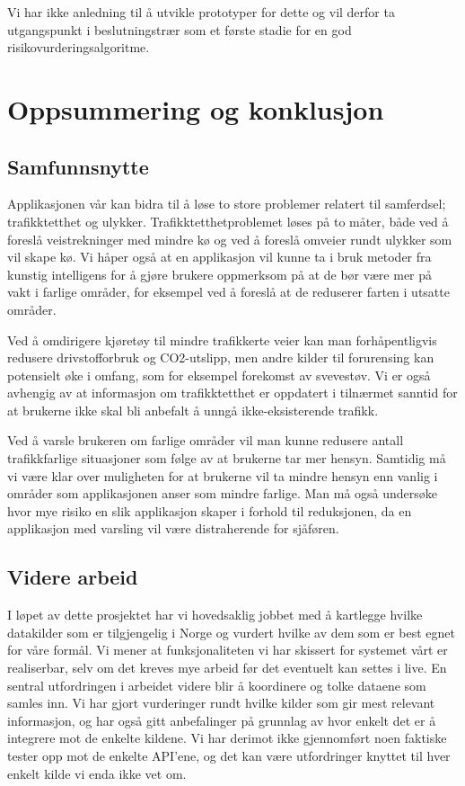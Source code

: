 \documentclass[a4paper,norsk,oneside]{book}
\begin{document}
Vi har ikke anledning til å utvikle prototyper for dette og vil derfor ta utgangspunkt i beslutningstrær som et første stadie for en god risikovurderingsalgoritme.



\chapter{Oppsummering og konklusjon}
\label{sec:konklusjon}

\section{Samfunnsnytte}
\label{sec:samfunnsnytte}

 Applikasjonen vår kan bidra til å løse to store problemer relatert til samferdsel; trafikktetthet og ulykker. Trafikktetthetproblemet løses på to måter, både ved å foreslå veistrekninger med mindre kø og ved å foreslå omveier rundt ulykker som vil skape kø. Vi håper også at en applikasjon vil kunne ta i bruk metoder fra kunstig intelligens for å gjøre brukere oppmerksom på at de bør være mer på vakt i farlige områder, for eksempel ved å foreslå at de reduserer farten i utsatte områder.

Ved å omdirigere kjøretøy til mindre trafikkerte veier kan man forhåpentligvis redusere drivstofforbruk og CO2-utslipp, men andre kilder til forurensing kan potensielt øke i omfang, som for eksempel forekomst av svevestøv. Vi er også avhengig av at informasjon om trafikktetthet er oppdatert i tilnærmet sanntid for at brukerne ikke skal bli anbefalt å unngå ikke-eksisterende trafikk.

Ved å varsle brukeren om farlige områder vil man kunne redusere antall trafikkfarlige situasjoner som følge av at brukerne tar mer hensyn. Samtidig må vi være klar over muligheten for at brukerne vil ta mindre hensyn enn vanlig i områder som applikasjonen anser som mindre farlige. Man må også undersøke hvor mye risiko en slik applikasjon skaper i forhold til reduksjonen, da en applikasjon med varsling vil være distraherende for sjåføren.


\section{Videre arbeid}
\label{sec:varbeid}

I løpet av dette prosjektet har vi hovedsaklig jobbet med å kartlegge hvilke datakilder som er tilgjengelig i Norge og vurdert hvilke av dem som er best egnet for våre formål. Vi mener at funksjonaliteten vi har skissert for systemet vårt er realiserbar, selv om det kreves mye arbeid før det eventuelt kan settes i live. En sentral utfordringen i arbeidet videre blir å koordinere og tolke dataene som samles inn. Vi har gjort vurderinger rundt hvilke kilder som gir mest relevant informasjon, og har også gitt anbefalinger på grunnlag av hvor enkelt det er å integrere mot de enkelte kildene. Vi har derimot ikke gjennomført noen faktiske tester opp mot de enkelte API'ene, og det kan være utfordringer knyttet til hver enkelt kilde vi enda ikke vet om. 
\end{document}
